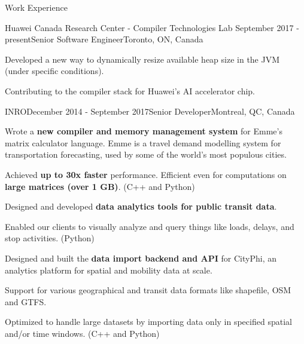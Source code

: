 \documentclass{resume} %
\begin{document}
\begin{rSection}{Work Experience}
\begin{rSubsection}{Huawei Canada Research Center - Compiler Technologies Lab}
	{September 2017 - present}{Senior Software Engineer}{Toronto, ON, Canada}
\item Developed a new way to dynamically resize available heap size in the JVM (under specific conditions).
\item Contributing to the compiler stack for Huawei's AI accelerator chip.
\end{rSubsection}

\begin{rSubsection}{INRO}{December 2014 - September 2017}{Senior Developer}{Montreal,
        QC, Canada}
\item Wrote a \textbf{new compiler and memory management system} for Emme's
        matrix calculator language. Emme is a travel demand modelling system
        for transportation forecasting, used by some of the world's most
        populous cities.
\begin{lsubSubsection} 
\item Achieved \textbf{up to 30x faster} performance. Efficient even for
        computations on \textbf{large matrices (over 1 GB)}. (C++ and Python)
\end{lsubSubsection}
\item Designed and developed \textbf{data analytics tools for public transit
        data}.
\begin{lsubSubsection}
\item Enabled our clients to visually analyze and query things like
        loads, delays, and stop activities. (Python)
\end{lsubSubsection}
\item Designed and built the \textbf{data import backend and API} for CityPhi,
        an analytics platform for spatial and mobility data at scale.
\begin{lsubSubsection}
\item Support for various geographical and transit data formats like shapefile,
        OSM and GTFS.
\item Optimized to handle large datasets by importing data only in specified
        spatial and/or time windows. (C++ and Python)
\end{lsubSubsection}
\end{rSubsection}


\end{rSection}
\end{document}
